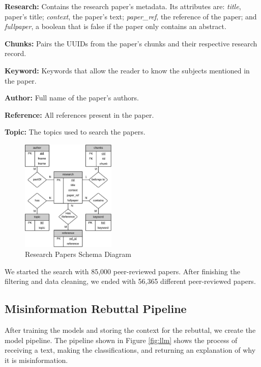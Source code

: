 \begin{description}
	\item{\textbf{Research:}}  Contains the research paper's metadata. Its attributes are: \textit{title}, paper's title; \textit{context}, the paper’s text; \textit{paper\_ref}, the reference of the paper; and \textit{fullpaper}, a boolean that is false if the paper only contains an abstract.
	\item{\textbf{Chunks:}} Pairs the UUIDs from the paper's chunks and their respective research record.  
	\item{\textbf{Keyword:}} Keywords that allow the reader to know the subjects mentioned in the paper. 
	\item{\textbf{Author:}} Full name of the paper's authors. 
	\item{\textbf{Reference:}} All references present in the paper.
	\item{\textbf{Topic:}} The topics used to search the papers.

\end{description}

\begin{figure}[htbp]
	\begin{center}
		\includegraphics[width=0.4\textwidth]{figures/Table_diagram.jpeg} %
	\end{center}
	\caption{Research Papers Schema Diagram} %
	\label{fig:table}
\end{figure}


We started the search with 85,000 peer-reviewed papers. After finishing the filtering and data cleaning, we ended with 56,365 different peer-reviewed papers. 


\subsection{Misinformation Rebuttal Pipeline}
After training the models and storing the context for the rebuttal, we create the model pipeline. The pipeline shown in Figure \ref{fig:llm} shows the process of receiving a text, making the classifications, and returning an explanation of why it is misinformation.


